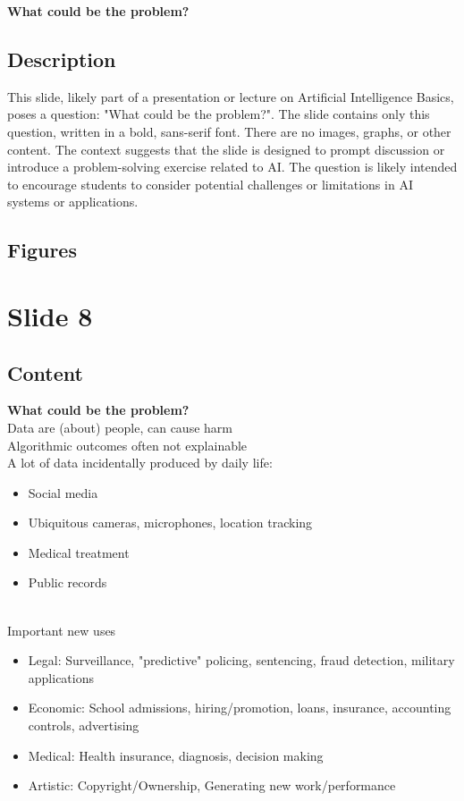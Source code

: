 \documentclass{article}%
\begin{document}
\textbf{What could be the problem?}
%
\subsection{Description}%
This slide, likely part of a presentation or lecture on Artificial Intelligence Basics, poses a question: "What could be the problem?".  The slide contains only this question, written in a bold, sans-serif font.  There are no images, graphs, or other content.  The context suggests that the slide is designed to prompt discussion or introduce a problem-solving exercise related to AI.  The question is likely intended to encourage students to consider potential challenges or limitations in AI systems or applications.%
\subsection{Figures}%
\begin{figure}[H]%
\centering%
\end{figure}

%
\newpage%
\section{Slide 8}%
\label{sec:Slide8}%
\subsection{Content}%

\textbf{What could be the problem?} \\
Data are (about) people, can cause harm \\
Algorithmic outcomes often not explainable \\
A lot of data incidentally produced by daily life: \\
\begin{itemize}
    \item Social media
    \item Ubiquitous cameras, microphones, location tracking
    \item Medical treatment
    \item Public records
\end{itemize} \\
Important new uses \\
\begin{itemize}
    \item Legal: Surveillance, "predictive" policing, sentencing, fraud detection, military applications
    \item Economic: School admissions, hiring/promotion, loans, insurance, accounting controls, advertising
    \item Medical: Health insurance, diagnosis, decision making
    \item Artistic: Copyright/Ownership, Generating new work/performance
\end{itemize}
%
\end{document}
